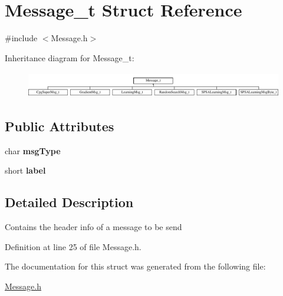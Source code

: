 \hypertarget{structMessage__t}{
\section{Message\_\-t Struct Reference}
\label{structMessage__t}
}


{\ttfamily \#include $<$Message.h$>$}

Inheritance diagram for Message\_\-t:\begin{figure}[H]
\begin{center}
\leavevmode
\includegraphics[height=1.152263cm]{structMessage__t}
\end{center}
\end{figure}
\subsection*{Public Attributes}
\begin{DoxyCompactItemize}
\item 
\hypertarget{structMessage__t_aa7a7b1d2a1c2499f36e7e27618367ab0}{
char {\bfseries msgType}}
\label{structMessage__t_aa7a7b1d2a1c2499f36e7e27618367ab0}

\item 
\hypertarget{structMessage__t_a2417a9b6f24a2244a60aceaa4168a22a}{
short {\bfseries label}}
\label{structMessage__t_a2417a9b6f24a2244a60aceaa4168a22a}

\end{DoxyCompactItemize}


\subsection{Detailed Description}
Contains the header info of a message to be send 

Definition at line 25 of file Message.h.



The documentation for this struct was generated from the following file:\begin{DoxyCompactItemize}
\item 
\hyperlink{Message_8h}{Message.h}\end{DoxyCompactItemize}
